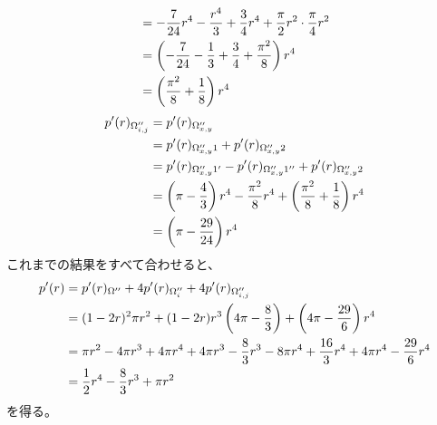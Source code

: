 \documentclass[letterpaper,10pt,english]{sphinxmanual}
\begin{document}
\begin{gather}
\begin{split}
\begin{align}
&= -\frac{7}{24}r^{4} - \frac{r^{4}}{3} + \frac{3}{4}r^{4} + \frac{\pi}{2}r^{2}\cdot \frac{\pi}{4}r^{2}\\
&= \left( - \frac{7}{24} - \frac{1}{3} + \frac{3}{4} + \frac{\pi^{2}}{8}\right)r^{4}\\
&= \left( \frac{\pi^{2}}{8} + \frac{1}{8} \right)r^{4}
\end{align}\end{split}\notag
\end{gather}\begin{gather}
\begin{split}\begin{align}
p'(r)_{\Omega''_{i,j}} &= p'(r)_{\Omega''_{x, y}}\\
&= p'(r)_{\Omega''_{x, y}1}  +p'(r)_{\Omega''_{x, y}2}\\
&= p'(r)_{\Omega''_{x, y}1'} - p'(r)_{\Omega''_{x, y}1''} + p'(r)_{\Omega''_{x, y}2}\\
&= \left(\pi -\frac{4}{3}\right)r^{4} - \frac{\pi^{2}}{8}r^{4} + \left( \frac{\pi^{2}}{8} + \frac{1}{8} \right)r^{4}\\
&= \left(\pi -\frac{29}{24}\right)r^{4}
\end{align}\end{split}\notag
\end{gather}
これまでの結果をすべて合わせると、
\begin{gather}
\begin{split}\begin{align}
p'(r) &= p'(r)_{\Omega''} + 4p'(r)_{\Omega''_{i}} + 4p'(r)_{\Omega''_{i,j}}\\
&= (1-2r)^{2}\pi r^{2} + (1-2r)r^{3}\left( 4\pi-\frac{8}{3} \right) + \left(4\pi -\frac{29}{6}\right)r^{4}\\
&= \pi r^{2} - 4\pi r^{3} + 4\pi r^{4} + 4\pi r^{3} -\frac{8}{3}r^{3} - 8\pi r^{4} + \frac{16}{3}r^{4} + 4\pi r^{4} - \frac{29}{6}r^{4}\\
&= \frac{1}{2}r^{4} -\frac{8}{3}r^{3} + \pi r^{2}
\end{align}\end{split}\notag
\end{gather}
を得る。
\end{document}
